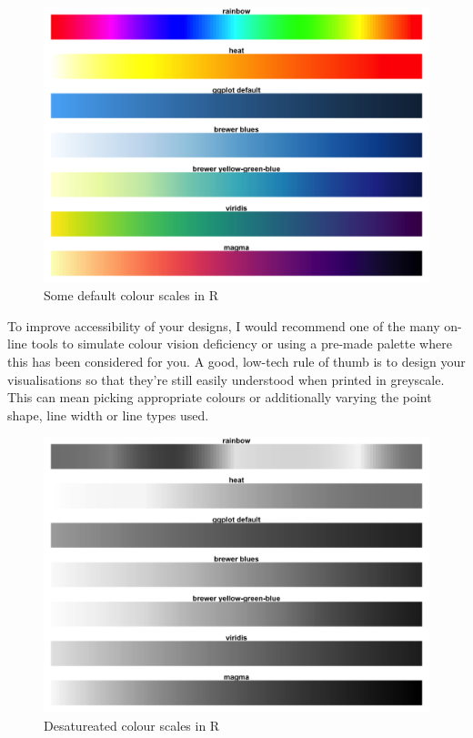 \documentclass[
  letterpaper,
  DIV=11,
  numbers=noendperiod]{scrreprt}
\begin{document}
\begin{figure}[H]

{\centering \includegraphics[width=1\textwidth,height=\textheight]{images/303-data-visualisation/saturated-colour-scales.png}

}

\caption{Some default colour scales in R}

\end{figure}%

To improve accessibility of your designs, I would recommend one of the
many on-line tools to simulate colour vision deficiency or using a
pre-made palette where this has been considered for you. A good,
low-tech rule of thumb is to design your visualisations so that they're
still easily understood when printed in greyscale. This can mean picking
appropriate colours or additionally varying the point shape, line width
or line types used.

\begin{figure}[H]

{\centering \includegraphics[width=1\textwidth,height=\textheight]{images/303-data-visualisation/desaturated-colour-scales.png}

}

\caption{Desatureated colour scales in R}

\end{figure}%
\end{document}
